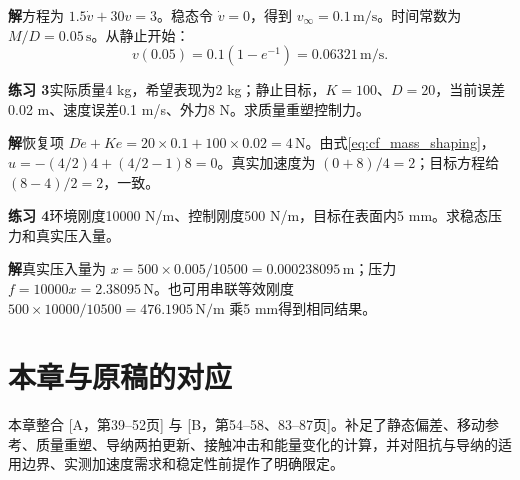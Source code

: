 \textbf{解}\quad 方程为 $1.5\dot v+30v=3$。稳态令 $\dot v=0$，得到 $v_\infty=0.1\,\mathrm{m/s}$。时间常数为 $M/D=0.05\,\mathrm{s}$。从静止开始：
\[
v(0.05)=0.1(1-e^{-1})=0.06321\,\mathrm{m/s}.
\]

\textbf{练习 3}\quad 实际质量4 kg，希望表现为2 kg；静止目标，$K=100$、$D=20$，当前误差0.02 m、速度误差0.1 m/s、外力8 N。求质量重塑控制力。

\textbf{解}\quad 恢复项 $D\dot e+Ke=20\times0.1+100\times0.02=4\,\mathrm{N}$。由式\eqref{eq:cf_mass_shaping}，$u=-(4/2)4+(4/2-1)8=0$。真实加速度为 $(0+8)/4=2$；目标方程给 $(8-4)/2=2$，一致。

\textbf{练习 4}\quad 环境刚度10000 N/m、控制刚度500 N/m，目标在表面内5 mm。求稳态压力和真实压入量。

\textbf{解}\quad 真实压入量为 $x=500\times0.005/10500=0.000238095\,\mathrm{m}$；压力 $f=10000x=2.38095\,\mathrm{N}$。也可用串联等效刚度 $500\times10000/10500=476.1905\,\mathrm{N/m}$ 乘5 mm得到相同结果。

\section*{本章与原稿的对应}
本章整合 [A，第39--52页] 与 [B，第54--58、83--87页]。补足了静态偏差、移动参考、质量重塑、导纳两拍更新、接触冲击和能量变化的计算，并对阻抗与导纳的适用边界、实测加速度需求和稳定性前提作了明确限定。
